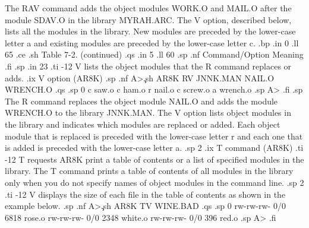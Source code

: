 The RAV command adds the object modules WORK.O and
MAIL.O after the module SDAV.O in the library MYRAH.ARC. 
The V option, described below, lists all the modules in the
library.  New modules are preceded by the lower-case letter a
and existing modules are preceded by the lower-case letter c.
.bp
.in 0
.ll 65
.ce
.sh
Table 7-2.  (continued)
.qs
.in 5
.ll 60
.sp
.nf
Command/Option                   Meaning
.fi
.sp
.in 23
.ti -12
V           lists the object modules that the R command replaces or adds.
.ix V option (AR8K)
.sp
.nf
A>\c
.sh
AR8K RV JNNK.MAN NAIL.O WRENCH.O
.qs
.sp 0
c saw.o
c ham.o
r nail.o
c screw.o
a wrench.o
.sp
A>
.fi
.sp
The R command replaces the object module NAIL.O and adds the
module WRENCH.O to the library JNNK.MAN.  The V option lists
object modules in the library and indicates which modules are
replaced or added.  Each object module that is replaced is
preceded with the lower-case letter r and each one that is added
is preceded with the lower-case letter a. 
.sp 2
.ix T command (AR8K)
.ti -12
T           requests AR8K print a table of contents or a list of
specified modules in the library.  The T command prints a  table
of contents of all modules in the library only when you do not
specify names of object modules in the command line. 
.sp 2
.ti -12
V           displays the size of each file in the table of contents as 
shown in the example below.
.sp
.nf
A>\c
.sh
AR8K TV WINE.BAD
.qs
.sp 0
rw-rw-rw- 0/0    6818 rose.o
rw-rw-rw- 0/0    2348 white.o
rw-rw-rw- 0/0     396 red.o
.sp
A>
.fi

